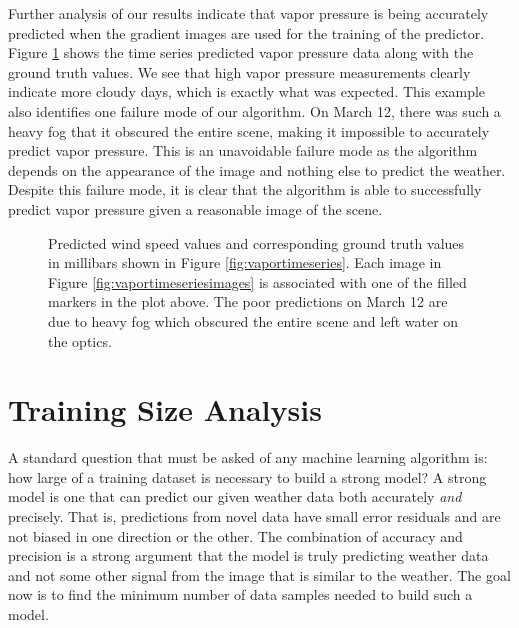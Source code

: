 Further analysis of our results indicate that vapor pressure is being accurately predicted when the gradient images are used for the training of the predictor. Figure \ref{fig:vaporpred} shows the time series predicted vapor pressure data along with the ground truth values. We see that high vapor pressure measurements clearly indicate more cloudy days, which is exactly what was expected. This example also identifies one failure mode of our algorithm. On March 12, there was such a heavy fog that it obscured the entire scene, making it impossible to accurately predict vapor pressure. This is an unavoidable failure mode as the algorithm depends on the appearance of the image and nothing else to predict the weather. Despite this failure mode, it is clear that the algorithm is able to successfully predict vapor pressure given a reasonable image of the scene.
\begin{figure}
	\centering
	\caption[Predicted wind speed values and corresponding ground truth values in millibars]{Predicted wind speed values and corresponding ground truth values in millibars shown in Figure \ref{fig:vaportimeseries}. Each image in Figure \ref{fig:vaportimeseriesimages} is associated with one of the filled markers in the plot above. The poor predictions on March 12 are due to heavy fog which obscured the entire scene and left water on the optics.}
	\label{fig:vaporpred}
\end{figure}


\section{Training Size Analysis}
A standard question that must be asked of any machine learning algorithm is: how large of a training dataset is necessary to build a strong model? A strong model is one that can predict our given weather data both accurately \textit{and} precisely. That is, predictions from novel data have small error residuals and are not biased in one direction or the other. The combination of accuracy and precision is a strong argument that the model is truly predicting weather data and not some other signal from the image that is similar to the weather. The goal now is to find the minimum number of data samples needed to build such a model. 

